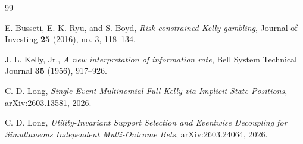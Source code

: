 \documentclass[11pt]{article}
\theoremstyle{definition}
\theoremstyle{remark}
\newcommand{\1}{\mathbf{1}}
\begin{document}
\begin{thebibliography}{99}

E. Busseti, E. K. Ryu, and S. Boyd,
\emph{Risk-constrained Kelly gambling},
Journal of Investing \textbf{25} (2016), no. 3, 118--134.

J. L. Kelly, Jr.,
\emph{A new interpretation of information rate},
Bell System Technical Journal \textbf{35} (1956), 917--926.

C. D. Long,
\emph{Single-Event Multinomial Full Kelly via Implicit State Positions},
arXiv:2603.13581, 2026.

C. D. Long,
\emph{Utility-Invariant Support Selection and Eventwise Decoupling for Simultaneous Independent Multi-Outcome Bets},
arXiv:2603.24064, 2026.

\end{thebibliography}
\end{document}
